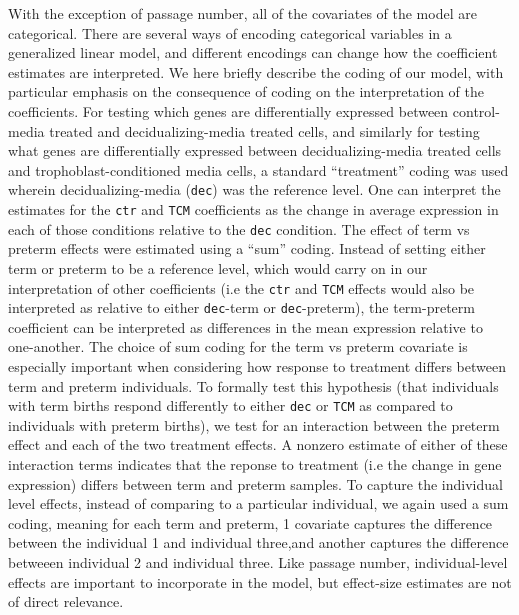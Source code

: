 With the exception of passage number, all of the covariates of the model are
categorical. There are several ways of encoding categorical variables in a generalized linear model, and different encodings can change how the coefficient
estimates are interpreted. We here briefly describe the coding of our model, with particular emphasis on the consequence of coding on the interpretation of the coefficients.  For testing which genes are differentially expressed
between control-media treated and decidualizing-media treated cells, and similarly for testing what genes are differentially expressed between decidualizing-media treated cells and trophoblast-conditioned media cells, a standard
``treatment'' coding was used wherein decidualizing-media (\texttt{dec}) was the reference level.
One can interpret the estimates for the \texttt{ctr} and \texttt{TCM} coefficients as the change in average expression in each of those conditions relative to the \texttt{dec} condition.
The effect of term vs preterm effects were estimated using a ``sum'' coding. Instead of setting either term or preterm to be a reference level, which would carry on in our interpretation of other coefficients (i.e the \texttt{ctr} and \texttt{TCM} effects would also be interpreted as relative to either \texttt{dec}-term or \texttt{dec}-preterm), the term-preterm coefficient can be interpreted as differences in the mean expression relative to one-another.
The choice of sum coding for the term vs preterm covariate is especially important when considering how response to treatment differs between term and preterm individuals.
To formally test this hypothesis (that individuals with term births respond differently to either \texttt{dec} or \texttt{TCM} as compared to individuals with preterm births), we test for an interaction between the preterm effect
and each of the two treatment effects.  A nonzero estimate of either of these interaction terms indicates that the reponse to treatment (i.e the change in gene expression) differs between term and preterm samples.
To capture the individual level effects, instead of comparing to a particular individual, we again used a sum coding, meaning for each term and preterm,  1 covariate captures the difference between the individual 1 and individual three,and another captures the difference betweeen individual 2 and individual three.
Like passage number, individual-level effects are important to incorporate in the model, but effect-size estimates are not of direct relevance.

